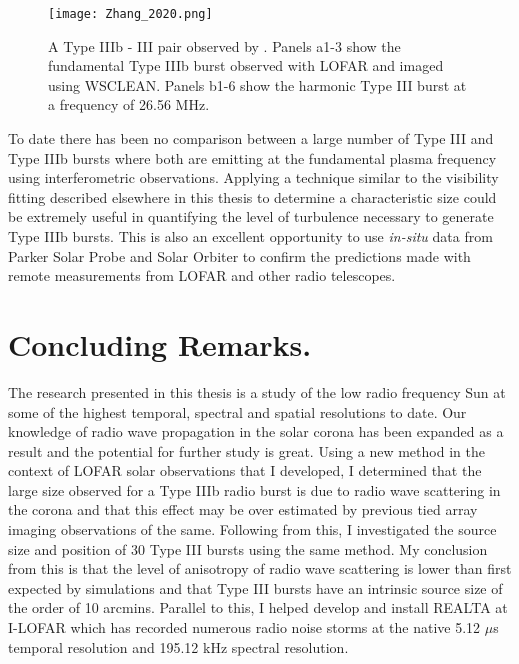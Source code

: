 \begin{figure}[ht]
\centering
\texttt{[image: Zhang\_2020.png]}
\caption[Type IIIb - III pair observed by \cite{Zhang2020}]{A Type IIIb - III pair observed by \cite{Zhang2020}. Panels a1-3 show the fundamental Type IIIb burst observed with LOFAR and imaged using WSCLEAN. Panels b1-6 show the harmonic Type III burst at a frequency of 26.56 MHz.}
\label{fig:typeIIIbIII}
\end{figure}

To date there has been no comparison between a large number of Type III and Type IIIb bursts where both are emitting at the fundamental plasma frequency using interferometric observations. Applying a technique similar to the visibility fitting described elsewhere in this thesis to determine a characteristic size could be extremely useful in quantifying the level of turbulence necessary to generate Type IIIb bursts. This is also an excellent opportunity to use \textit{in-situ} data from Parker Solar Probe \citep[PSP;][]{Fox2016} and Solar Orbiter \citep{Muller2020} to confirm the predictions made with remote measurements from LOFAR and other radio telescopes. 


\section{Concluding Remarks.}
The research presented in this thesis is a study of the low radio frequency Sun at some of the highest temporal, spectral and spatial resolutions to date. Our knowledge of radio wave propagation in the solar corona has been expanded as a result and the potential for further study is great. Using a new method in the context of LOFAR solar observations that I developed, I determined that the large size observed for a Type IIIb radio burst is due to radio wave scattering in the corona and that this effect may be over estimated by previous tied array imaging observations of the same. Following from this, I investigated the source size and position of 30 Type III bursts using the same method. My conclusion from this is that the level of anisotropy of radio wave scattering is lower than first expected by simulations and that Type III bursts have an intrinsic source size of the order of 10 arcmins. Parallel to this, I helped develop and install REALTA at I-LOFAR which has recorded numerous radio noise storms at the native 5.12 $\mu$s temporal resolution and 195.12 kHz spectral resolution. 

